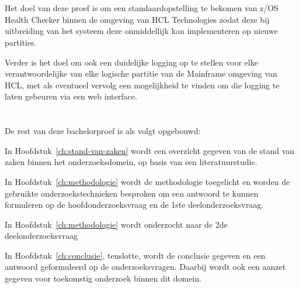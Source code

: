 \section{}
\label{sec:onderzoeksdoelstelling}

Het doel van deze proef is om een standaardopstelling te bekomen van z/OS Health Checker binnen de omgeving van HCL Technologies zodat deze bij uitbreiding van het systeem deze onmiddellijk kan implementeren op nieuwe partities.

Verder is het doel om ook een duidelijke logging op te stellen voor elke verantwoordelijke van elke logische partitie van de Mainframe omgeving van HCL, met als eventueel vervolg een mogelijkheid te vinden om die logging te laten gebeuren via een web interface.

\section{}
\label{sec:opzet-bachelorproef}


De rest van deze bachelorproef is als volgt opgebouwd:

In Hoofdstuk~\ref{ch:stand-van-zaken} wordt een overzicht gegeven van de stand van zaken binnen het onderzoeksdomein, op basis van een literatuurstudie.

In Hoofdstuk~\ref{ch:methodologie} wordt de methodologie toegelicht en worden de gebruikte onderzoekstechnieken besproken om een antwoord te kunnen formuleren op de hoofdonderzoeksvraag en de 1ste deelonderzoeksvraag.

In Hoofdstuk~\ref{ch:methodologie} wordt onderzocht naar de 2de deelonderzoeksvraag 



In Hoofdstuk~\ref{ch:conclusie}, tenslotte, wordt de conclusie gegeven en een antwoord geformuleerd op de onderzoeksvragen. Daarbij wordt ook een aanzet gegeven voor toekomstig onderzoek binnen dit domein.